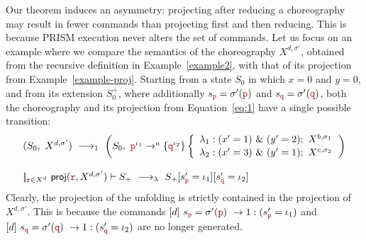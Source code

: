 \begin{remark}
  Our theorem induces an asymmetry: projecting after reducing a
  choreography may result in fewer commands than projecting first and
  then reducing. This is because PRISM execution never alters the set
  of commands.  Let us focus on an example where we compare the
  semantics of the choreography \(X^{d,\sigma'}\), obtained from the
  recursive definition in Example~\ref{example2}, with that of its
  projection from Example~\ref{example-proj}. Starting from a state
  \(S_0\) in which \(x=0\) and \(y=0\), and from its extension
  \(S_0^+\), where additionally \(s_{\nr}=\sigma'(\nr)\) and
  \(s_{\nrr}=\sigma'(\nrr)\), both the choreography and its projection
  from Equation~\ref{eq:1} have a single possible transition:
  \begin{displaymath}
    \begin{array}{lll}
      (S_0,\ X^{d,\sigma'})\red 1
      \left(S_0,\ \interactBasel{\nr^{\iota_1}}{a}{\nrr^{\iota_2}}
      \left\{
      \begin{array}{lll}
        \lambda_1 : (x'=1)\ \&\ (y'=2);\ X^{b,\sigma_1} \\[0.5mm]
        \lambda_2 : (x'=3)\ \&\ (y'=1);\ X^{c,\sigma_2}
      \end{array}
      \right.\right)
      \\\\
      \pp_{\nrrr\in X^d}\ \proj (\nrrr, X^{d,\sigma'})\vdash S_{+}
      \red{\lambda} S_{+}[s_{\nr}'=\iota_1][s_{\nrr}'=\iota_2]
    \end{array}
  \end{displaymath}
  Clearly, the projection of the unfolding is strictly contained in
  the projection of \(X^{d,\sigma'}\). This is because
  the commands
  \(\commandBase{d}{s_{\nr}=\sigma'(\nr)}{1:(s_{\nr}'=\iota_1)}\) and
  \(\commandBase{d}{s_{\nrr}=\sigma'(\nrr)}{1:(s_{\nrr}'=\iota_2)}\)
  are no longer generated.

\end{remark}

